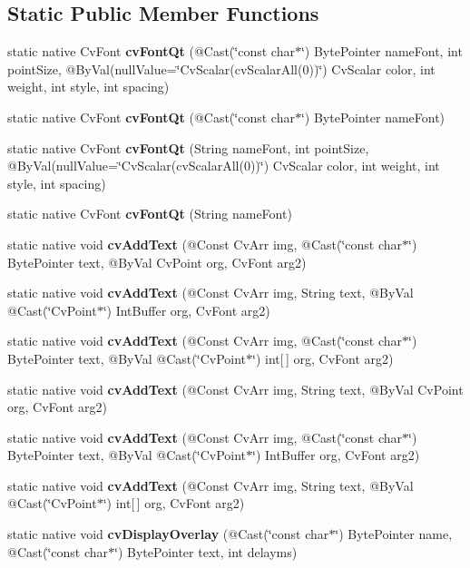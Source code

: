 \subsection*{Static Public Member Functions}
\begin{DoxyCompactItemize}
\item 
static native Cv\+Font {\bfseries cv\+Font\+Qt} (@Cast(\char`\"{}const char$\ast$\char`\"{}) Byte\+Pointer name\+Font, int point\+Size, @By\+Val(null\+Value=\char`\"{}Cv\+Scalar(cv\+Scalar\+All(0))\char`\"{}) Cv\+Scalar color, int weight, int style, int spacing)
\item 
static native Cv\+Font {\bfseries cv\+Font\+Qt} (@Cast(\char`\"{}const char$\ast$\char`\"{}) Byte\+Pointer name\+Font)
\item 
static native Cv\+Font {\bfseries cv\+Font\+Qt} (String name\+Font, int point\+Size, @By\+Val(null\+Value=\char`\"{}Cv\+Scalar(cv\+Scalar\+All(0))\char`\"{}) Cv\+Scalar color, int weight, int style, int spacing)
\item 
static native Cv\+Font {\bfseries cv\+Font\+Qt} (String name\+Font)
\item 
static native void {\bfseries cv\+Add\+Text} (@Const Cv\+Arr img, @Cast(\char`\"{}const char$\ast$\char`\"{}) Byte\+Pointer text, @By\+Val Cv\+Point org, Cv\+Font arg2)
\item 
static native void {\bfseries cv\+Add\+Text} (@Const Cv\+Arr img, String text, @By\+Val @Cast(\char`\"{}Cv\+Point$\ast$\char`\"{}) Int\+Buffer org, Cv\+Font arg2)
\item 
static native void {\bfseries cv\+Add\+Text} (@Const Cv\+Arr img, @Cast(\char`\"{}const char$\ast$\char`\"{}) Byte\+Pointer text, @By\+Val @Cast(\char`\"{}Cv\+Point$\ast$\char`\"{}) int\mbox{[}$\,$\mbox{]} org, Cv\+Font arg2)
\item 
static native void {\bfseries cv\+Add\+Text} (@Const Cv\+Arr img, String text, @By\+Val Cv\+Point org, Cv\+Font arg2)
\item 
static native void {\bfseries cv\+Add\+Text} (@Const Cv\+Arr img, @Cast(\char`\"{}const char$\ast$\char`\"{}) Byte\+Pointer text, @By\+Val @Cast(\char`\"{}Cv\+Point$\ast$\char`\"{}) Int\+Buffer org, Cv\+Font arg2)
\item 
static native void {\bfseries cv\+Add\+Text} (@Const Cv\+Arr img, String text, @By\+Val @Cast(\char`\"{}Cv\+Point$\ast$\char`\"{}) int\mbox{[}$\,$\mbox{]} org, Cv\+Font arg2)
\item 
static native void {\bfseries cv\+Display\+Overlay} (@Cast(\char`\"{}const char$\ast$\char`\"{}) Byte\+Pointer name, @Cast(\char`\"{}const char$\ast$\char`\"{}) Byte\+Pointer text, int delayms)

\end{DoxyCompactItemize}
